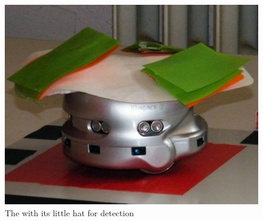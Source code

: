 \begin{figure}
    \begin{center}
        \includegraphics[width=\textwidth]{./img/kheperacrop.png}
        \caption[The \khepera{}]{%
        The \khepera{} with its little hat for detection}
    \end{center}
\end{figure}
